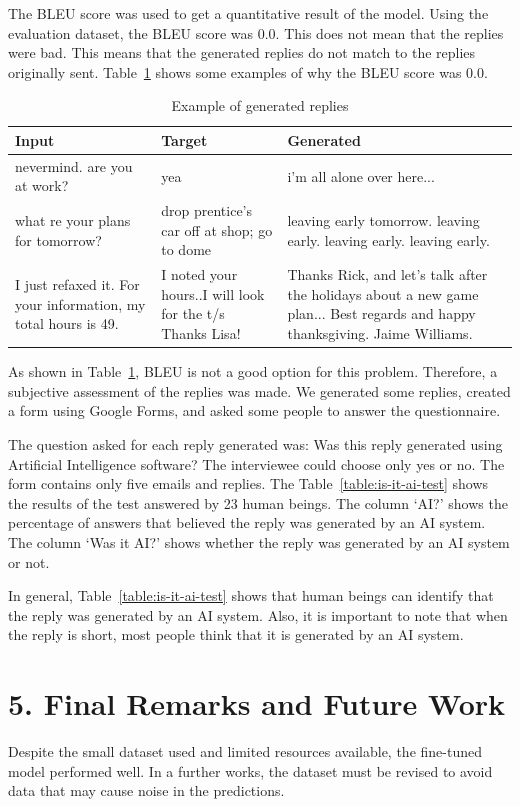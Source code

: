 \documentclass[letterpaper]{article}
\begin{document}
The BLEU score was used to get a quantitative result of the model. Using the evaluation dataset, the BLEU score was \num{0.0}. This does not mean that the replies were bad. This means that the generated replies do not match to the replies originally sent. Table~\ref{table:example-reply-bleu} shows some examples of why the BLEU score was \num{0.0}.

\begin{table}[ht]
    \centering
    \begin{tabularx}{0.47\textwidth}{|X|X|X|}
        \hline
        \textbf{Input} & \textbf{Target} & \textbf{Generated} \\
        \hline
        nevermind.  are you at work? & yea & i'm all alone over here... \\
        \hline
        what re your plans for tomorrow? & drop prentice's car off at shop; go to dome              & leaving early tomorrow. leaving early. leaving early. leaving early. \\
        \hline
        I just refaxed it.  For your information, my total hours is 49. & I noted your hours..I will look for the t/s Thanks Lisa! & Thanks Rick, and let's talk after the holidays about a new game plan... Best regards and happy thanksgiving. Jaime Williams. \\
        \hline
    \end{tabularx}
    \caption{Example of generated replies}
    \label{table:example-reply-bleu}
\end{table}

As shown in Table~\ref{table:example-reply-bleu}, BLEU is not a good option for this problem. Therefore, a subjective assessment of the replies was made. We generated some replies, created a form using Google Forms, and asked some people to answer the questionnaire.

The question asked for each reply generated was: Was this reply generated using Artificial Intelligence software? The interviewee could choose only yes or no. The form contains only five emails and replies. The Table~\ref{table:is-it-ai-test} shows the results of the test answered by 23 human beings. The column `AI?' shows the percentage of answers that believed the reply was generated by an AI system. The column `Was it AI?' shows whether the reply was generated by an AI system or not.

In general, Table~\ref{table:is-it-ai-test} shows that human beings can identify that the reply was generated by an AI system. Also, it is important to note that when the reply is short, most people think that it is generated by an AI system.


\section{5. Final Remarks and Future Work}

Despite the small dataset used and limited resources available, the fine-tuned model performed well. In a further works, the dataset must be revised to avoid data that may cause noise in the predictions. 




\end{document}
